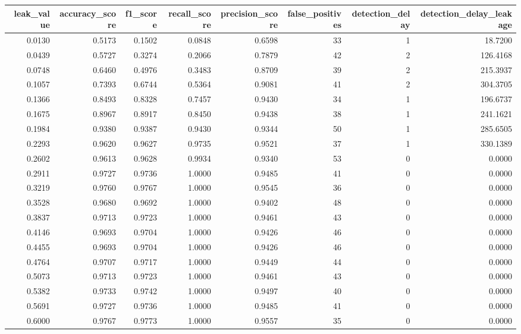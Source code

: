 \begin{tabular}{rrrrrrrr}
\toprule
leak\_value & accuracy\_score & f1\_score & recall\_score & precision\_score & false\_positives & detection\_delay & detection\_delay\_leakage \\
\midrule
0.0130 & 0.5173 & 0.1502 & 0.0848 & 0.6598 & 33 & 1 & 18.7200 \\
0.0439 & 0.5727 & 0.3274 & 0.2066 & 0.7879 & 42 & 2 & 126.4168 \\
0.0748 & 0.6460 & 0.4976 & 0.3483 & 0.8709 & 39 & 2 & 215.3937 \\
0.1057 & 0.7393 & 0.6744 & 0.5364 & 0.9081 & 41 & 2 & 304.3705 \\
0.1366 & 0.8493 & 0.8328 & 0.7457 & 0.9430 & 34 & 1 & 196.6737 \\
0.1675 & 0.8967 & 0.8917 & 0.8450 & 0.9438 & 38 & 1 & 241.1621 \\
0.1984 & 0.9380 & 0.9387 & 0.9430 & 0.9344 & 50 & 1 & 285.6505 \\
0.2293 & 0.9620 & 0.9627 & 0.9735 & 0.9521 & 37 & 1 & 330.1389 \\
0.2602 & 0.9613 & 0.9628 & 0.9934 & 0.9340 & 53 & 0 & 0.0000 \\
0.2911 & 0.9727 & 0.9736 & 1.0000 & 0.9485 & 41 & 0 & 0.0000 \\
0.3219 & 0.9760 & 0.9767 & 1.0000 & 0.9545 & 36 & 0 & 0.0000 \\
0.3528 & 0.9680 & 0.9692 & 1.0000 & 0.9402 & 48 & 0 & 0.0000 \\
0.3837 & 0.9713 & 0.9723 & 1.0000 & 0.9461 & 43 & 0 & 0.0000 \\
0.4146 & 0.9693 & 0.9704 & 1.0000 & 0.9426 & 46 & 0 & 0.0000 \\
0.4455 & 0.9693 & 0.9704 & 1.0000 & 0.9426 & 46 & 0 & 0.0000 \\
0.4764 & 0.9707 & 0.9717 & 1.0000 & 0.9449 & 44 & 0 & 0.0000 \\
0.5073 & 0.9713 & 0.9723 & 1.0000 & 0.9461 & 43 & 0 & 0.0000 \\
0.5382 & 0.9733 & 0.9742 & 1.0000 & 0.9497 & 40 & 0 & 0.0000 \\
0.5691 & 0.9727 & 0.9736 & 1.0000 & 0.9485 & 41 & 0 & 0.0000 \\
0.6000 & 0.9767 & 0.9773 & 1.0000 & 0.9557 & 35 & 0 & 0.0000 \\
\bottomrule
\end{tabular}
